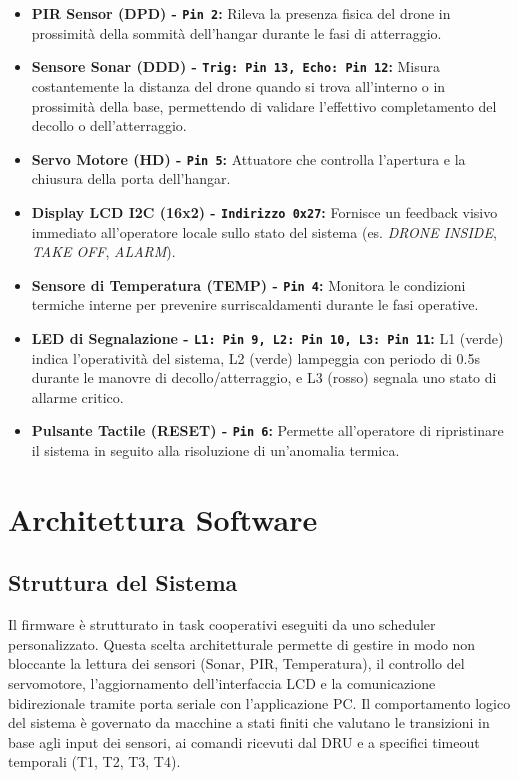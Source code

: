 \documentclass[12pt, a4paper]{article}
\begin{document}
\begin{itemize}
    \item \textbf{PIR Sensor (DPD) - \texttt{Pin 2}:} Rileva la presenza fisica del drone in prossimità della sommità dell'hangar durante le fasi di atterraggio.
    \item \textbf{Sensore Sonar (DDD) - \texttt{Trig: Pin 13, Echo: Pin 12}:} Misura costantemente la distanza del drone quando si trova all'interno o in prossimità della base, permettendo di validare l'effettivo completamento del decollo o dell'atterraggio. 
    \item \textbf{Servo Motore (HD) - \texttt{Pin 5}:} Attuatore che controlla l'apertura e la chiusura della porta dell'hangar.
    \item \textbf{Display LCD I2C (16x2) - \texttt{Indirizzo 0x27}:} Fornisce un feedback visivo immediato all'operatore locale sullo stato del sistema (es. \textit{DRONE INSIDE}, \textit{TAKE OFF}, \textit{ALARM}).
    \item \textbf{Sensore di Temperatura (TEMP) - \texttt{Pin 4}:} Monitora le condizioni termiche interne per prevenire surriscaldamenti durante le fasi operative.
    \item \textbf{LED di Segnalazione - \texttt{L1: Pin 9, L2: Pin 10, L3: Pin 11}:} L1 (verde) indica l'operatività del sistema, L2 (verde) lampeggia con periodo di 0.5s durante le manovre di decollo/atterraggio, e L3 (rosso) segnala uno stato di allarme critico.
    \item \textbf{Pulsante Tactile (RESET) - \texttt{Pin 6}:} Permette all'operatore di ripristinare il sistema in seguito alla risoluzione di un'anomalia termica.
\end{itemize}

\section{Architettura Software}

\subsection{Struttura del Sistema}
Il firmware è strutturato in task cooperativi eseguiti da uno scheduler personalizzato. Questa scelta architetturale permette di gestire in modo non bloccante la lettura dei sensori (Sonar, PIR, Temperatura), il controllo del servomotore, l'aggiornamento dell'interfaccia LCD e la comunicazione bidirezionale tramite porta seriale con l'applicazione PC. Il comportamento logico del sistema è governato da macchine a stati finiti che valutano le transizioni in base agli input dei sensori, ai comandi ricevuti dal DRU e a specifici timeout temporali (T1, T2, T3, T4).
\newpage
\end{document}
